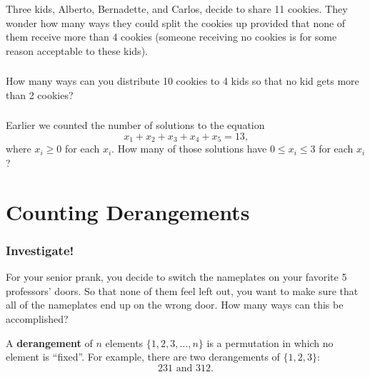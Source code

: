 \documentclass[11pt, compress]{beamer}
\newcommand{\terminology}[1]{\textbf{#1}}
\begin{document}
\begin{frame}
\frametitle{}
\begin{example}[1.6.1]Three kids, Alberto, Bernadette, and Carlos, decide to share 11 cookies. They wonder how many ways they could split the cookies up provided that none of them receive more than 4 cookies (someone receiving no cookies is for some reason acceptable to these kids).
\end{example}
\end{frame}
 
\begin{frame}
\frametitle{}
\begin{example}[1.6.2]How many ways can you distribute 10 cookies to 4 kids so that no kid gets more than 2 cookies?
\end{example}
\end{frame}
 
\begin{frame}
\frametitle{}
\begin{example}[1.6.3]Earlier we counted the number of solutions to the equation%
\begin{equation*}
x_1 + x_2 + x_3 + x_4 + x_5 = 13\text{,}
\end{equation*}
where \(x_i \ge 0\) for each \(x_i\).
How many of those solutions have \(0 \le x_i \le 3\) for each \(x_i\)?
\end{example}
\end{frame}
 


\section{Counting Derangements}
\begin{frame}
\frametitle{Investigate!}
 For your senior prank, you decide to switch the nameplates on your favorite 5 professors' doors. So that none of them feel left out, you want to make sure that all of the nameplates end up on the wrong door. How many ways can this be accomplished?
 
\pause \vfill 

A \terminology{derangement} of \(n\) elements \(\{1, 2, 3, \ldots, n\}\) is a permutation in which no element is ``fixed''.  For example, there are two derangements of \(\{1,2,3\}\):%
\begin{equation*}
231 \text{ and } 312.
\end{equation*}

\end{frame}
 
\end{document}
